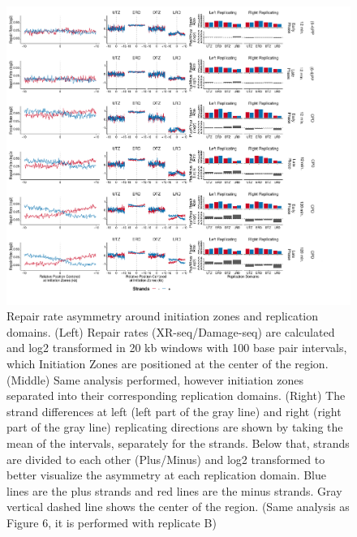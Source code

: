 \begin{figure}[H]
\begin{center}
\includegraphics[width=\textwidth]{Chapters/7_appendix/figures/supfig12}
\caption[Repair rate asymmetry around initiation zones and replication domains.]{Repair rate asymmetry around initiation zones and replication domains. (Left) Repair rates (XR-seq/Damage-seq) are calculated and log2 transformed in 20 kb windows with 100 base pair intervals, which Initiation Zones are positioned at the center of the region. (Middle) Same analysis performed, however initiation zones separated into their corresponding replication domains. (Right) The strand differences at left (left part of the gray line) and right (right part of the gray line) replicating directions are shown by taking the mean of the intervals, separately for the strands. Below that, strands are divided to each other (Plus/Minus) and log2 transformed to better visualize the asymmetry at each replication domain. Blue lines are the plus strands and red lines are the minus strands. Gray vertical dashed line shows the center of the region. (Same analysis as Figure 6, it is performed with replicate B)}
\label{supfig:repairrate}
\end{center}
\end{figure}

